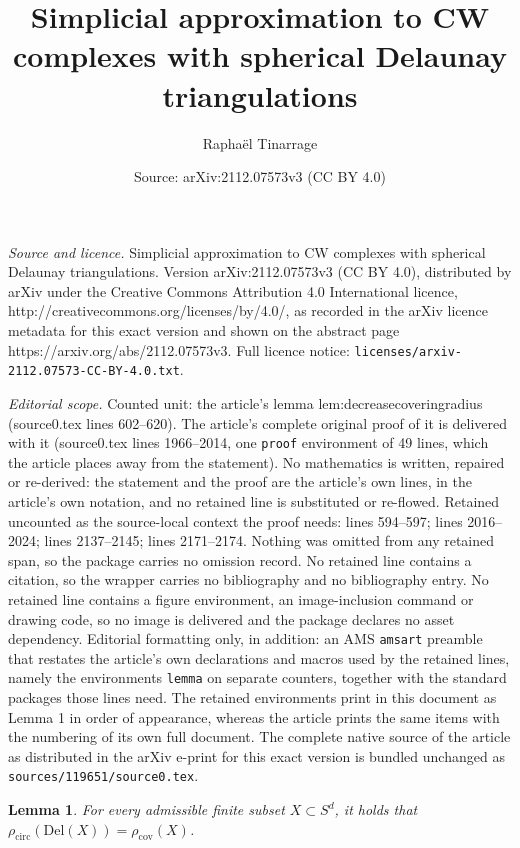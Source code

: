 \documentclass[10pt,a4paper]{amsart}
\title{Simplicial approximation to CW complexes with spherical Delaunay triangulations}
\author{Rapha\"el Tinarrage}
\date{Source: arXiv:2112.07573v3 (CC BY 4.0)}
\newtheorem{lemma}{Lemma}
\newcommand{\Del}[1] { \mathrm{Del}(#1) } %
\begin{document}
\maketitle

\noindent\emph{Source and licence.} Simplicial approximation to CW complexes with spherical Delaunay triangulations. Version arXiv:2112.07573v3 (CC BY 4.0), distributed by arXiv under the Creative Commons Attribution 4.0 International licence, http://creativecommons.org/licenses/by/4.0/, as recorded in the arXiv licence metadata for this exact version and shown on the abstract page https://arxiv.org/abs/2112.07573v3. Full licence notice: \texttt{licenses/arxiv-2112.07573-CC-BY-4.0.txt}.\par\smallskip

\noindent\textit{Editorial scope.} Counted unit: the article's lemma lem:decreasecoveringradius (source0.tex lines 602--620). The article's complete original proof of it is delivered with it (source0.tex lines 1966--2014, one \texttt{proof} environment of 49 lines, which the article places away from the statement). No mathematics is written, repaired or re-derived: the statement and the proof are the article's own lines, in the article's own notation, and no retained line is substituted or re-flowed.  Retained uncounted as the source-local context the proof needs: lines 594--597; lines 2016--2024; lines 2137--2145; lines 2171--2174.  Nothing was omitted from any retained span, so the package carries no omission record.  No retained line contains a citation, so the wrapper carries no bibliography and no bibliography entry.  No retained line contains a figure environment, an image-inclusion command or drawing code, so no image is delivered and the package declares no asset dependency.  Editorial formatting only, in addition: an AMS \texttt{amsart} preamble that restates the article's own declarations and macros used by the retained lines, namely the environments \texttt{lemma} on separate counters, together with the standard packages those lines need.  The retained environments print in this document as Lemma 1 in order of appearance, whereas the article prints the same items with the numbering of its own full document.  The complete native source of the article as distributed in the arXiv e-print for this exact version is bundled unchanged as \texttt{sources/119651/source0.tex}.
\begin{lemma}
	\label{lem:equality_covering_circumradius}
	For every admissible finite subset $X\subset S^d$, it holds that $\rho_\mathrm{circ}(\Del{X}) = \rho_\mathrm{cov}(X)$.
\end{lemma}
\end{document}

